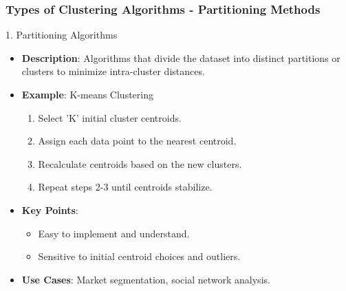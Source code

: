 \documentclass[aspectratio=169]{beamer}
\begin{document}
\begin{frame}[fragile]
    \frametitle{Types of Clustering Algorithms - Partitioning Methods}
    \begin{block}{1. Partitioning Algorithms}
        \begin{itemize}
            \item \textbf{Description}: Algorithms that divide the dataset into distinct partitions or clusters to minimize intra-cluster distances.
            \item \textbf{Example}: K-means Clustering
            \begin{enumerate}
                \item Select 'K' initial cluster centroids.
                \item Assign each data point to the nearest centroid.
                \item Recalculate centroids based on the new clusters.
                \item Repeat steps 2-3 until centroids stabilize.
            \end{enumerate}
            \item \textbf{Key Points}:
            \begin{itemize}
                \item Easy to implement and understand.
                \item Sensitive to initial centroid choices and outliers.
            \end{itemize}
            \item \textbf{Use Cases}: Market segmentation, social network analysis.
        \end{itemize}
    \end{block}
\end{frame}
\end{document}
